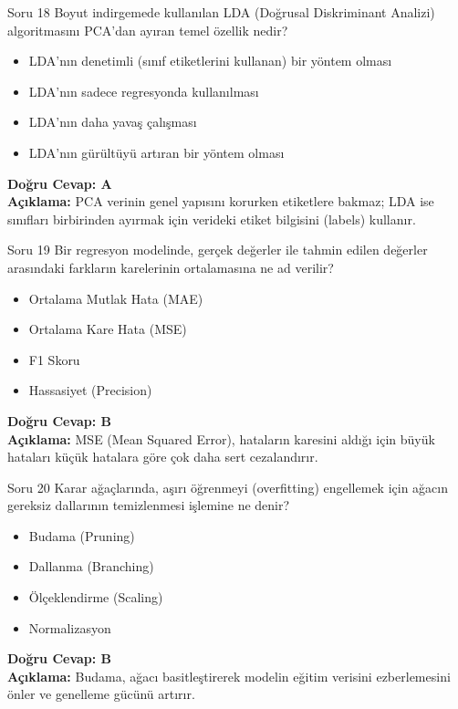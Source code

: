 \documentclass[12pt,a4paper]{article}
\begin{document}
\begin{testcard}{Soru 18}
    Boyut indirgemede kullanılan LDA (Doğrusal Diskriminant Analizi) algoritmasını PCA'dan ayıran temel özellik nedir?
    \begin{itemize}
        \item[A)] LDA'nın denetimli (sınıf etiketlerini kullanan) bir yöntem olması
        \item[B)] LDA'nın sadece regresyonda kullanılması
        \item[C)] LDA'nın daha yavaş çalışması
        \item[D)] LDA'nın gürültüyü artıran bir yöntem olması
    \end{itemize}
    \tcblower
    \textbf{Doğru Cevap: A} \\
    \textbf{Açıklama:} PCA verinin genel yapısını korurken etiketlere bakmaz; LDA ise sınıfları birbirinden ayırmak için verideki etiket bilgisini (labels) kullanır.
\end{testcard}

\begin{testcard}{Soru 19}
    Bir regresyon modelinde, gerçek değerler ile tahmin edilen değerler arasındaki farkların karelerinin ortalamasına ne ad verilir?
    \begin{itemize}
        \item[A)] Ortalama Mutlak Hata (MAE)
        \item[B)] Ortalama Kare Hata (MSE)
        \item[C)] F1 Skoru
        \item[D)] Hassasiyet (Precision)
    \end{itemize}
    \tcblower
    \textbf{Doğru Cevap: B} \\
    \textbf{Açıklama:} MSE (Mean Squared Error), hataların karesini aldığı için büyük hataları küçük hatalara göre çok daha sert cezalandırır.
\end{testcard}

\begin{testcard}{Soru 20}
    Karar ağaçlarında, aşırı öğrenmeyi (overfitting) engellemek için ağacın gereksiz dallarının temizlenmesi işlemine ne denir?
    \begin{itemize}
        \item[A)] Budama (Pruning)
        \item[B)] Dallanma (Branching)
        \item[C)] Ölçeklendirme (Scaling)
        \item[D)] Normalizasyon
    \end{itemize}
    \tcblower
    \textbf{Doğru Cevap: B} \\
    \textbf{Açıklama:} Budama, ağacı basitleştirerek modelin eğitim verisini ezberlemesini önler ve genelleme gücünü artırır.
\end{testcard}
\end{document}
